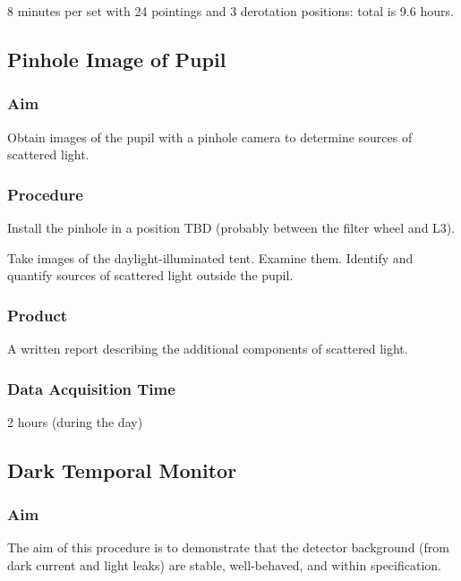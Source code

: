 \documentclass{article}
\begin{document}
8 minutes per set with 24 pointings and 3 derotation positions: total is 9.6 hours.


\subsection{Pinhole Image of Pupil}

\subsubsection{Aim}

Obtain images of the pupil with a pinhole camera to determine sources of scattered light.

\subsubsection{Procedure}

Install the pinhole in a position TBD (probably between the filter wheel and L3).

Take images of the daylight-illuminated tent. Examine them. Identify and quantify sources of scattered light outside the pupil.

\subsubsection{Product}

A written report describing the additional components of scattered light.

\subsubsection{Data Acquisition Time}

2 hours (during the day)


\subsection{Dark Temporal Monitor}

\subsubsection{Aim}

The aim of this procedure is to demonstrate that the detector background (from dark current and light leaks) are stable, well-behaved, and within specification.
\end{document}
